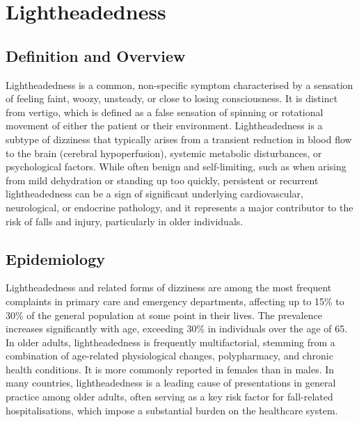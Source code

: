 \chapter{Lightheadedness}

\section*{Definition and Overview}
Lightheadedness is a common, non-specific symptom characterised by a sensation of feeling faint, woozy, unsteady, or close to losing consciousness. It is distinct from vertigo, which is defined as a false sensation of spinning or rotational movement of either the patient or their environment. Lightheadedness is a subtype of dizziness that typically arises from a transient reduction in blood flow to the brain (cerebral hypoperfusion), systemic metabolic disturbances, or psychological factors. While often benign and self-limiting, such as when arising from mild dehydration or standing up too quickly, persistent or recurrent lightheadedness can be a sign of significant underlying cardiovascular, neurological, or endocrine pathology, and it represents a major contributor to the risk of falls and injury, particularly in older individuals.

\section*{Epidemiology}
Lightheadedness and related forms of dizziness are among the most frequent complaints in primary care and emergency departments, affecting up to 15\% to 30\% of the general population at some point in their lives. The prevalence increases significantly with age, exceeding 30\% in individuals over the age of 65. In older adults, lightheadedness is frequently multifactorial, stemming from a combination of age-related physiological changes, polypharmacy, and chronic health conditions. It is more commonly reported in females than in males. In many countries, lightheadedness is a leading cause of presentations in general practice among older adults, often serving as a key risk factor for fall-related hospitalisations, which impose a substantial burden on the healthcare system.

